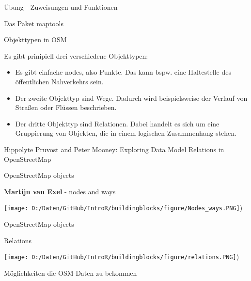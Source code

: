 \documentclass[ignorenonframetext,]{beamer}
\providecommand{\tightlist}{%
  \setlength{\itemsep}{0pt}\setlength{\parskip}{0pt}}
\begin{document}
\begin{frame}[fragile]{Übung - Zuweisungen und Funktionen}
\begin{frame}[fragile]{Das Paket maptools}
\begin{frame}{Objekttypen in OSM}
\begin{block}{Es gibt prinipiell drei verschiedene Objekttypen:}
\begin{itemize}
\tightlist
\item
  Es gibt einfache nodes, also Punkte. Das kann bspw. eine Haltestelle
  des öffentlichen Nahverkehrs sein.
\item
  Der zweite Objekttyp sind Wege. Dadurch wird beispielsweise der
  Verlauf von Straßen oder Flüssen beschrieben.
\item
  Der dritte Objekttyp sind Relationen. Dabei handelt es sich um eine
  Gruppierung von Objekten, die in einem logischen Zusammenhang stehen.
\end{itemize}

Hippolyte Pruvost and Peter Mooney: Exploring Data Model Relations in
OpenStreetMap

\end{block}

\end{frame}

\begin{frame}{OpenStreetMap objects}

\begin{block}{\href{https://www.slideshare.net/mvexel/openstreetmap-9819440}{\textbf{Martijn
van Exel}} - nodes and ways}

\texttt{[image: D:/Daten/GitHub/IntroR/buildingblocks/figure/Nodes\_ways.PNG]})

\end{block}

\end{frame}

\begin{frame}{OpenStreetMap objects}

\begin{block}{Relations}

\texttt{[image: D:/Daten/GitHub/IntroR/buildingblocks/figure/relations.PNG]})

\end{block}

\end{frame}

\begin{frame}{Möglichkeiten die OSM-Daten zu bekommen}


\end{frame}
\end{frame}
\end{frame}
\end{document}

